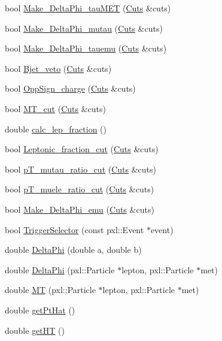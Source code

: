 \begin{DoxyCompactItemize}
bool \hyperlink{classspecialAna_a977d93938993f07d68c995d0b6b93f5e}{Make\-\_\-\-Delta\-Phi\-\_\-tau\-M\-E\-T} (\hyperlink{classCuts}{Cuts} \&cuts)
\item 
bool \hyperlink{classspecialAna_aebff8eb590cd7facedac62b7f92fe0a4}{Make\-\_\-\-Delta\-Phi\-\_\-mutau} (\hyperlink{classCuts}{Cuts} \&cuts)
\item 
bool \hyperlink{classspecialAna_a4ee793e1dd340b2d82928a62a207cc8b}{Make\-\_\-\-Delta\-Phi\-\_\-tauemu} (\hyperlink{classCuts}{Cuts} \&cuts)
\item 
bool \hyperlink{classspecialAna_ac0e1d88ebff2ec0899b721e7c3ca2b0e}{Bjet\-\_\-veto} (\hyperlink{classCuts}{Cuts} \&cuts)
\item 
bool \hyperlink{classspecialAna_a00234e58c40f7c972287d1f06d17b547}{Opp\-Sign\-\_\-charge} (\hyperlink{classCuts}{Cuts} \&cuts)
\item 
bool \hyperlink{classspecialAna_a488e0e15a436a9ed877718101eb70ce4}{M\-T\-\_\-cut} (\hyperlink{classCuts}{Cuts} \&cuts)
\item 
double \hyperlink{classspecialAna_a1829be6b0581ef1d46258163466a899b}{calc\-\_\-lep\-\_\-fraction} ()
\item 
bool \hyperlink{classspecialAna_a5eba4cc7dd4f309946b1bcf79259b098}{Leptonic\-\_\-fraction\-\_\-cut} (\hyperlink{classCuts}{Cuts} \&cuts)
\item 
bool \hyperlink{classspecialAna_ae106d787dd2453faba4bfa0a99cb3253}{p\-T\-\_\-mutau\-\_\-ratio\-\_\-cut} (\hyperlink{classCuts}{Cuts} \&cuts)
\item 
bool \hyperlink{classspecialAna_abc40177d37851dc68b4fd8c9609a23a7}{p\-T\-\_\-muele\-\_\-ratio\-\_\-cut} (\hyperlink{classCuts}{Cuts} \&cuts)
\item 
bool \hyperlink{classspecialAna_a6f96f4a11c793dcc97e530cd5ff245a2}{Make\-\_\-\-Delta\-Phi\-\_\-emu} (\hyperlink{classCuts}{Cuts} \&cuts)
\item 
bool \hyperlink{classspecialAna_a28a598e3f0ef500d0d2171751fdfd842}{Trigger\-Selector} (const pxl\-::\-Event $\ast$event)
\item 
double \hyperlink{classspecialAna_a13633015e15fd8354abadae9b07a4a3a}{Delta\-Phi} (double a, double b)
\item 
double \hyperlink{classspecialAna_ae6b596bc1040d602298b5d0501abb13d}{Delta\-Phi} (pxl\-::\-Particle $\ast$lepton, pxl\-::\-Particle $\ast$met)
\item 
double \hyperlink{classspecialAna_af80d7455d04539410714b947025f4bf4}{M\-T} (pxl\-::\-Particle $\ast$lepton, pxl\-::\-Particle $\ast$met)
\item 
double \hyperlink{classspecialAna_ac6dc740c484c3291b7c8e4d707c109dc}{get\-Pt\-Hat} ()
\item 
double \hyperlink{classspecialAna_ab358fee251f1dc54cdf046e898361d83}{get\-H\-T} ()
\end{DoxyCompactItemize}
